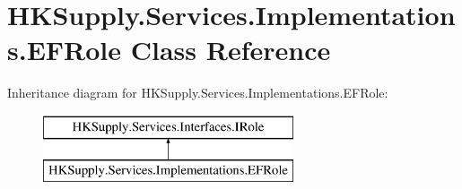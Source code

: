 \hypertarget{class_h_k_supply_1_1_services_1_1_implementations_1_1_e_f_role}{}\section{H\+K\+Supply.\+Services.\+Implementations.\+E\+F\+Role Class Reference}
\label{class_h_k_supply_1_1_services_1_1_implementations_1_1_e_f_role}
Inheritance diagram for H\+K\+Supply.\+Services.\+Implementations.\+E\+F\+Role\+:\begin{figure}[H]
\begin{center}
\leavevmode
\includegraphics[height=2.000000cm]{class_h_k_supply_1_1_services_1_1_implementations_1_1_e_f_role}
\end{center}
\end{figure}
